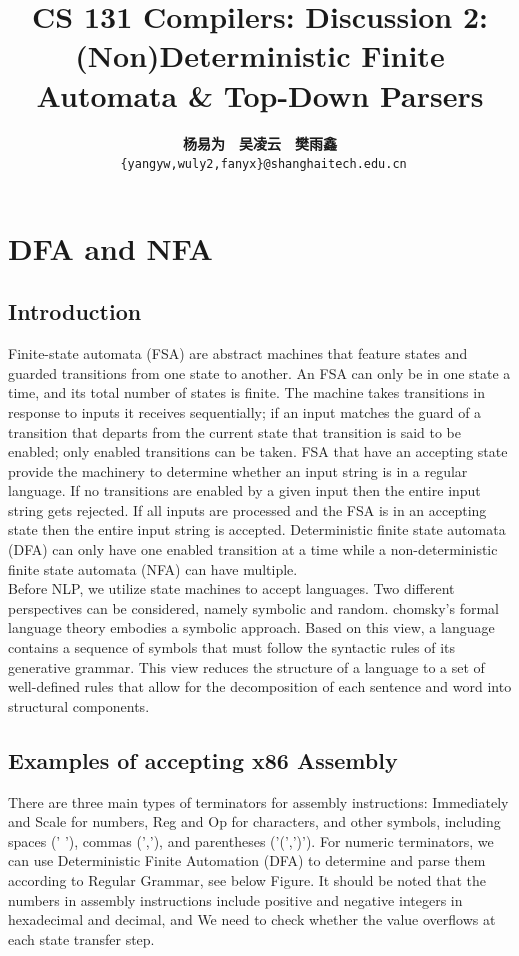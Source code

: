 \documentclass[a4paper]{exam}
\title{CS 131 Compilers: Discussion 2: (Non)Deterministic Finite Automata \& Top-Down Parsers}
\author{\textbf{杨易为}~~\textbf{吴凌云}~~\textbf{樊雨鑫} \\ \texttt{ \{yangyw,wuly2,fanyx\}@shanghaitech.edu.cn}}
\begin{document}
\maketitle
\section{DFA and NFA}
\subsection{Introduction}

Finite-state automata (FSA) are abstract machines that feature states and guarded transitions from one state to another. An FSA can only be in one state a time, and its total number of states is finite.  The machine takes transitions in response to inputs it receives sequentially;  if an input matches the guard of a transition that departs from the current state that transition is said to be enabled; only enabled transitions can be taken.  FSA that have an accepting state provide the machinery to determine whether an input string is in a regular language.  If no transitions are enabled by a given input then the entire input string gets  rejected.   If  all  inputs  are  processed  and  the  FSA  is  in  an  accepting  state  then  the entire input string is accepted.  Deterministic finite state automata (DFA) can only have one enabled transition at a time while a non-deterministic finite state automata (NFA) can have multiple.
\\
Before NLP, we utilize state machines to accept languages. Two different perspectives can be considered, namely symbolic and random. chomsky's formal language theory embodies a symbolic approach. Based on this view, a language contains a sequence of symbols that must follow the syntactic rules of its generative grammar. This view reduces the structure of a language to a set of well-defined rules that allow for the decomposition of each sentence and word into structural components.
\subsection{Examples of accepting x86 Assembly\cite{bcst}}
There are three main types of terminators for assembly instructions: Immediately and Scale for numbers, Reg and Op for characters, and other symbols, including spaces (' '), commas (','), and parentheses ('(',')'). For numeric terminators, we can use Deterministic Finite Automation (DFA) to determine and parse them according to Regular Grammar, see below Figure. It should be noted that the numbers in assembly instructions include positive and negative integers in hexadecimal and decimal, and We need to check whether the value overflows at each state transfer step.
\end{document}
